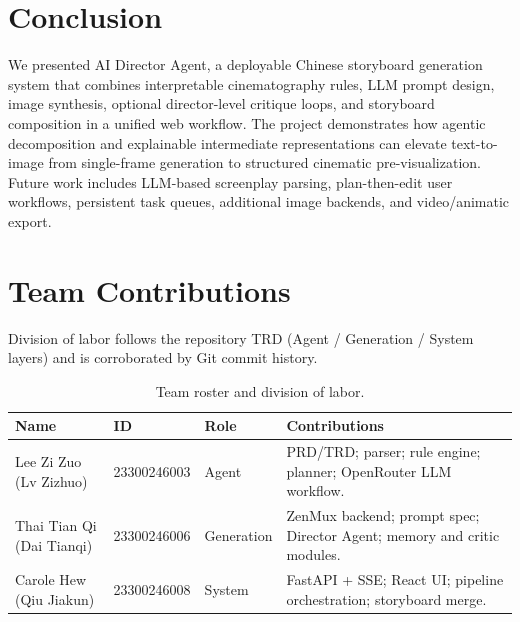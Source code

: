 \documentclass{article}
\begin{document}
\section{Conclusion}
\label{sec:conclusion}

We presented AI Director Agent, a deployable Chinese storyboard generation system that combines interpretable cinematography rules, LLM prompt design, image synthesis, optional director-level critique loops, and storyboard composition in a unified web workflow.
The project demonstrates how agentic decomposition and explainable intermediate representations can elevate text-to-image from single-frame generation to structured cinematic pre-visualization.
Future work includes LLM-based screenplay parsing, plan-then-edit user workflows, persistent task queues, additional image backends, and video/animatic export.

\section*{Team Contributions}
\label{sec:team}

Division of labor follows the repository TRD (Agent / Generation / System layers) and is corroborated by Git commit history.

\begin{table}[t]
\centering
\footnotesize
\setlength{\tabcolsep}{4pt}
\renewcommand{\arraystretch}{1.15}
\begin{tabularx}{\linewidth}{@{}l l l X@{}}
\toprule
\textbf{Name} & \textbf{ID} & \textbf{Role} & \textbf{Contributions} \\
\midrule
Lee Zi Zuo (Lv Zizhuo) & 23300246003 & Agent &
PRD/TRD; parser; rule engine; planner; OpenRouter LLM workflow. \\
Thai Tian Qi (Dai Tianqi) & 23300246006 & Generation &
ZenMux backend; prompt spec; Director Agent; memory and critic modules. \\
Carole Hew (Qiu Jiakun) & 23300246008 & System &
FastAPI + SSE; React UI; pipeline orchestration; storyboard merge. \\
\bottomrule
\end{tabularx}
\caption{Team roster and division of labor.}
\label{tab:team}
\end{table}



\end{document}
